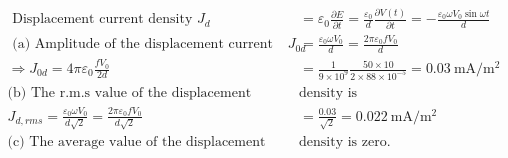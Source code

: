 \begin{enumerate}
\begin{answer}
	\begin{align*}
	\text { Displacement current density } J_{d}&=\varepsilon_{0} \frac{\partial E}{\partial t}=\frac{\varepsilon_{0}}{d} \frac{\partial V(t)}{\partial t}=-\frac{\varepsilon_{0} \omega V_{0} \sin \omega t}{d}\\
	\text { (a) Amplitude of the displacement current density } J_{0 d}&=\frac{\varepsilon_{0} \omega V_{0}}{d}=\frac{2 \pi \varepsilon_{0} f V_{0}}{d}\\
	\Rightarrow J_{0 d}=4 \pi \varepsilon_{0} \frac{f V_{0}}{2 d}&=\frac{1}{9 \times 10^{9}} \frac{50 \times 10}{2 \times 88 \times 10^{-5}}=0.03 \mathrm{~mA} / \mathrm{m}^{2}\\
	\text{(b) The r.m.s value of the displacement current  }&\text{density is}\\
	J_{d, r m s}=\frac{\varepsilon_{0} \omega V_{0}}{d \sqrt{2}}=\frac{2 \pi \varepsilon_{0} f V_{0}}{d \sqrt{2}}&=\frac{0.03}{\sqrt{2}}=0.022 \mathrm{~mA} / \mathrm{m}^{2}\\
	\text{(c) The average value of the displacement current  }&\text{density is zero.}
	\end{align*}
\end{answer}
\end{enumerate}












































